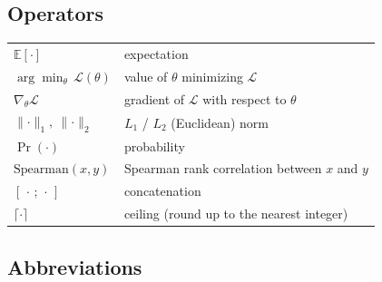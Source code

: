 \documentclass[english,12pt,a4paper,pdftex,elec,utf8]{aaltothesis}
\begin{document}
\subsection*{Operators}

\begin{tabular}{ll}
$\mathbb{E}[\cdot]$                          & expectation \\
$\arg\min_\theta\,\mathcal{L}(\theta)$       & value of $\theta$ minimizing $\mathcal{L}$ \\
$\nabla_\theta \mathcal{L}$                  & gradient of $\mathcal{L}$ with respect to $\theta$ \\
$\lVert \cdot \rVert_1,\ \lVert \cdot \rVert_2$ & $L_1$ / $L_2$ (Euclidean) norm \\
$\Pr(\cdot)$                                 & probability \\
$\mathrm{Spearman}(x,y)$                     & Spearman rank correlation between $x$ and $y$ \\
$[\,\cdot\,;\,\cdot\,]$                      & concatenation \\
$\lceil \cdot \rceil$                        & ceiling (round up to the nearest integer)
\end{tabular}

\subsection*{Abbreviations}
\end{document}
